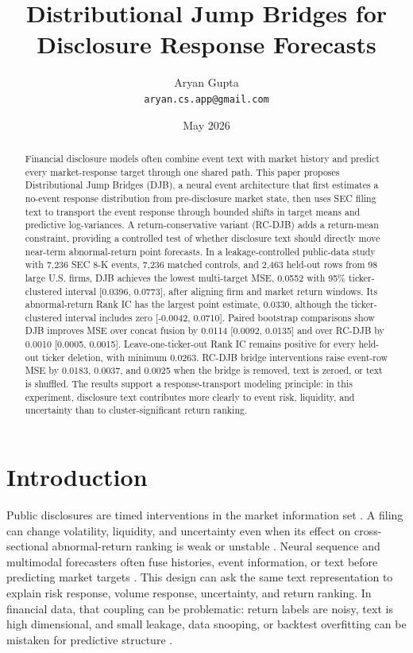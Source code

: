 \documentclass[10pt,letterpaper]{article}
\title{Distributional Jump Bridges for Disclosure Response Forecasts}
\author{
Aryan Gupta\\
\texttt{aryan.cs.app@gmail.com}
}
\date{May 2026}
\begin{document}
\maketitle

\begin{abstract}
Financial disclosure models often combine event text with market history and predict every
market-response target through one shared path. This paper proposes Distributional Jump Bridges
(DJB), a neural event architecture that first estimates a no-event response distribution from
pre-disclosure market state, then uses SEC filing text to transport the event response through
bounded shifts in target means and predictive log-variances. A return-conservative variant
(RC-DJB) adds a return-mean constraint, providing a controlled test of whether disclosure text
should directly move near-term abnormal-return point forecasts. In a leakage-controlled
public-data study with 7,236 SEC 8-K events, 7,236 matched controls, and 2,463 held-out rows from
98 large U.S. firms, DJB achieves the lowest multi-target MSE, 0.0552 with 95\%
ticker-clustered interval [0.0396, 0.0773],
after aligning firm and market return windows. Its abnormal-return Rank IC has the largest point
estimate, 0.0330, although the ticker-clustered interval includes zero
[-0.0042, 0.0710]. Paired bootstrap comparisons show DJB improves MSE over concat fusion by 0.0114
[0.0092, 0.0135] and over RC-DJB by 0.0010 [0.0005, 0.0015]. Leave-one-ticker-out Rank IC remains
positive for every held-out ticker deletion, with minimum 0.0263. RC-DJB bridge interventions raise
event-row MSE by 0.0183, 0.0037, and 0.0025 when the bridge is removed, text is zeroed, or text is
shuffled. The results support a response-transport modeling principle: in this experiment,
disclosure text contributes more clearly to event risk, liquidity, and uncertainty than to
cluster-significant return ranking.
\end{abstract}

\section{Introduction}

Public disclosures are timed interventions in the market information set
\citep{fama1970efficient,beaver1968information,patell1984anticipated}. A filing can change
volatility, liquidity, and uncertainty even when its effect on cross-sectional abnormal-return
ranking is weak or unstable \citep{bamber1986volume,kothari2001capital}. Neural sequence and
multimodal forecasters often fuse histories, event information, or text before predicting market
targets \citep{vaswani2017attention,lim2021temporal,chen2025camef}. This design can ask the same
text representation to explain risk response, volume response, uncertainty, and return ranking. In
financial data, that coupling can be problematic: return labels are noisy, text is high dimensional,
and small leakage, data snooping, or backtest overfitting can be mistaken for predictive structure
\citep{campbell1997econometrics,gu2020empirical,white2000reality,bailey2014probability,
lopezdeprado2018advances}.
\end{document}
